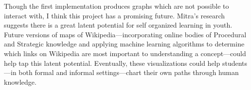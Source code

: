 \documentclass[man, 12pt, floatsintext, donotrepeattitle]{apa6}
\begin{document}
Though the first implementation produces graphs which are not possible to
interact with, I think this project has a promising future.  Mitra's research
suggests there is a great latent potential for self organized learning in youth.
Future versions of maps of Wikipedia---incorporating online bodies of
Procedural and Strategic knowledge and applying machine learning algorithms
to determine which links on Wikipedia are most important to understanding
a concept---could help tap this latent potential.  Eventually, these visualizations
could help students---in both formal and informal settings---chart their own
paths through human knowledge.




\appendix
\end{document}
